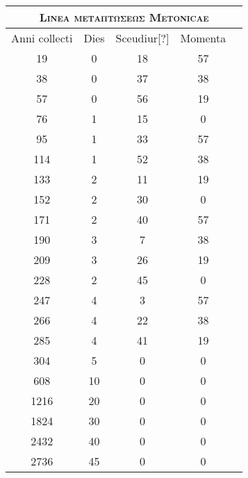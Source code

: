 %
% 
\begin{tabular}{@{}c c c c c@{} }
\toprule
\multicolumn{5}{c}{\Large\textsc{Linea \textgreek{μεταπτώσεως} Metonicae}}\\
\midrule
\multicolumn{1}{c}{Anni collecti} &
\multicolumn{1}{c}{Dies} &
\multicolumn{1}{c}{Sceudiur[?]} &
\multicolumn{1}{c}{Momenta}
\\
\midrule
  19 &  0 & 18 & 57 \\
  38 &  0 & 37 & 38 \\
  57 &  0 & 56 & 19 \\
  76 &  1 & 15 &  0 \\
  95 &  1 & 33 & 57 \\
 114 &  1 & 52 & 38 \\
 133 &  2 & 11 & 19 \\
 152 &  2 & 30 &  0 \\
 171 &  2 & 40 & 57 \\
 190 &  3 &  7 & 38 \\
 209 &  3 & 26 & 19 \\
 228 &  2 & 45 &  0 \\
 247 &  4 &  3 & 57 \\
 266 &  4 & 22 & 38 \\
 285 &  4 & 41 & 19 \\
 304 &  5 &  0 &  0 \\
\midrule
 608 & 10 &  0 &  0 \\
1216 & 20 &  0 &  0 \\
1824 & 30 &  0 &  0 \\
2432 & 40 &  0 &  0 \\
2736 & 45 &  0 &  0 \\
\bottomrule
\end{tabular}
% 
%
%